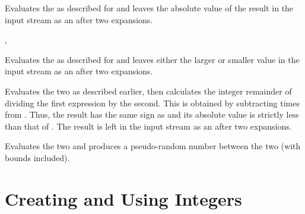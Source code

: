\documentclass[oneside]{book}
\begin{document}
\begin{function}{\IntMathAbs}
\begin{syntax}
 
\end{syntax}
Evaluates the  as described for
 and leaves the absolute value of the result in
the input stream as an  after two
expansions.
\end{function}

\begin{function}{\IntMathMax,\IntMathMin}
\begin{syntax}
  
  
\end{syntax}
Evaluates the  as described for
 and leaves either the larger or smaller value
in the input stream as an  after two
expansions.
\end{function}

\begin{function}{\IntMathMod}
\begin{syntax}
  
\end{syntax}
Evaluates the two  as described earlier,
then calculates the integer remainder of dividing the first
expression by the second.  This is obtained by subtracting
   times
 from .  Thus, the result has the
same sign as  and its absolute value is strictly
less than that of .  The result is left in the input
stream as an  after two expansions.
\end{function}

\begin{function}{\IntMathRand}
\begin{syntax}
  
\end{syntax}
Evaluates the two  and produces a
pseudo-random number between the two (with bounds included).
\end{function}

\section{Creating and Using Integers}
\end{document}
